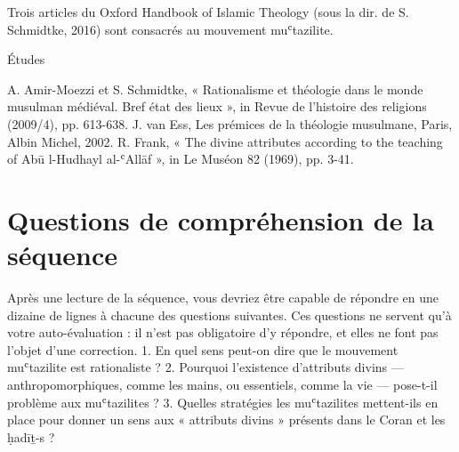 Trois articles du Oxford Handbook of Islamic Theology (sous la dir. de S. Schmidtke, 2016) sont
consacrés au mouvement muʿtazilite.


Études


A. Amir-Moezzi et S. Schmidtke, « Rationalisme et théologie dans le monde musulman médiéval. Bref état des lieux », in Revue de l’histoire des religions (2009/4), pp. 613-638.
J. van Ess, Les prémices de la théologie musulmane, Paris, Albin Michel, 2002.
R. Frank, « The divine attributes according to the teaching of Abū l-Hudhayl al-ʿAllāf », in Le Muséon 82 (1969), pp. 3-41.

\section{Questions de compréhension de la séquence}
     Après une lecture de la séquence, vous devriez être capable de répondre en une dizaine de lignes à chacune des questions suivantes. Ces questions ne servent qu’à votre auto-évaluation : il n’est pas obligatoire d’y répondre, et elles ne font pas l’objet d’une correction.  1. En quel sens peut-on dire que le mouvement muʿtazilite est rationaliste ?  2. Pourquoi l’existence d’attributs divins — anthropomorphiques, comme les mains, ou essentiels, comme la vie — pose-t-il problème aux muʿtazilites ?  3. Quelles stratégies les muʿtazilites mettent-ils en place pour donner un sens aux « attributs divins » présents dans le Coran et les ḥadīṯ-s ? 